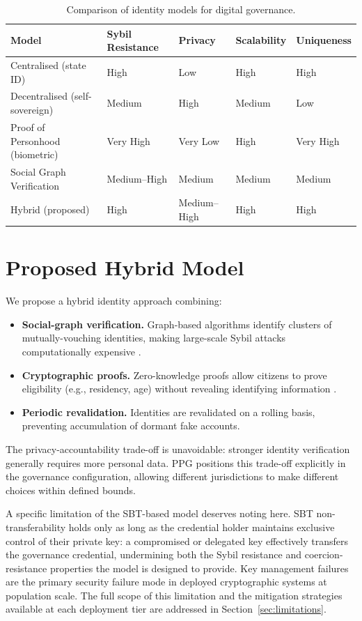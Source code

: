\documentclass[12pt,a4paper,oneside]{report}
\begin{document}
\begin{table}[htbp]
\centering
\caption{Comparison of identity models for digital governance.}
\begin{tabular}{@{} p{3.5cm} p{2.2cm} p{2.2cm} p{2.2cm} p{2.2cm} @{}}
\toprule
\textbf{Model} & \textbf{Sybil Resistance} & \textbf{Privacy} & \textbf{Scalability} & \textbf{Uniqueness} \\
\midrule
Centralised (state ID)     & High & Low  & High & High \\
Decentralised (self-sovereign) & Medium & High & Medium & Low \\
Proof of Personhood (biometric) & Very High & Very Low & High & Very High \\
Social Graph Verification  & Medium--High & Medium & Medium & Medium \\
Hybrid (proposed)          & High & Medium--High & High & High \\
\bottomrule
\end{tabular}
\label{tab:identity}
\end{table}

\section{Proposed Hybrid Model}

We propose a hybrid identity approach combining:

\begin{itemize}
  \item \textbf{Social-graph verification.} Graph-based algorithms identify clusters of mutually-vouching identities, making large-scale Sybil attacks computationally expensive \citep{pentland2014social}.
  \item \textbf{Cryptographic proofs.} Zero-knowledge proofs allow citizens to prove eligibility (e.g., residency, age) without revealing identifying information \citep{boneh2020graduate}.
  \item \textbf{Periodic revalidation.} Identities are revalidated on a rolling basis, preventing accumulation of dormant fake accounts.
\end{itemize}

The privacy-accountability trade-off is unavoidable: stronger identity verification generally requires more personal data. PPG positions this trade-off explicitly in the governance configuration, allowing different jurisdictions to make different choices within defined bounds.

A specific limitation of the SBT-based model deserves noting here. SBT non-transferability holds only as long as the credential holder maintains exclusive control of their private key: a compromised or delegated key effectively transfers the governance credential, undermining both the Sybil resistance and coercion-resistance properties the model is designed to provide. Key management failures are the primary security failure mode in deployed cryptographic systems at population scale. The full scope of this limitation and the mitigation strategies available at each deployment tier are addressed in Section~\ref{sec:limitations}.
\end{document}
